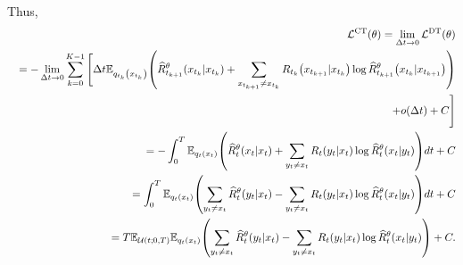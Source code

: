 \documentclass{article}
\begin{document}
Thus,
\begin{eqnarray*}
  &&\mathcal{L}^\text{CT}(\theta) = \lim_{\Delta t\to 0}\mathcal{L}^\text{DT}(\theta) \\
  &&= - \lim_{\Delta t\to 0}\sum_{k=0}^{K-1}\Bigg[\Delta t\mathbb{E}_{q_{t_k}\qty(x_{t_k})}\qty(\widehat{R}_{t_{k+1}}^\theta\qty(x_{t_k}|x_{t_k}) + \sum_{x_{t_{k+1}}\neq x_{t_k}}R_{t_k}\qty(x_{t_{k+1}}|x_{t_k}) \log \widehat{R}_{t_{k+1}}^\theta\qty(x_{t_k}|x_{t_{k+1}})) \\
  &&+ o(\Delta t) + C\Bigg]\\
  &&= - \int_0^T \mathbb{E}_{q_t\qty(x_t)}\qty(\widehat{R}_t^\theta\qty(x_t|x_t) + \sum_{y_t\neq x_t}R_t(y_t|x_t)\log\widehat{R}_t^\theta(x_t|y_t))dt + C\\
  &&=\int_0^T \mathbb{E}_{q_t\qty(x_t)}\qty(\sum_{y_t\neq x_t}\widehat{R}_t^\theta\qty(y_t|x_t) - \sum_{y_t\neq x_t}R_t\qty(y_t|x_t)\log\widehat{R}_t^\theta\qty(x_t|y_t))dt + C\\
  &&=T\mathbb{E}_{\mathcal{U}(t;0,T)}\mathbb{E}_{q_t\qty(x_t)}\qty(\sum_{y_t\neq x_t}\widehat{R}_t^\theta\qty(y_t|x_t) - \sum_{y_t\neq x_t}R_t\qty(y_t|x_t)\log\widehat{R}_t^\theta\qty(x_t|y_t)) + C.
\end{eqnarray*}
\end{document}
